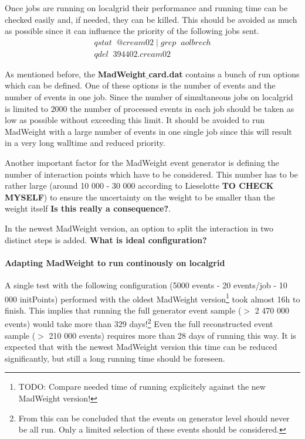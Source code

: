 Once jobs are running on localgrid their performance and running time can be checked easily and, if needed, they can be killed. This should be avoided as much as possible since it can influence the priority of the following jobs sent.
\begin{eqnarray}
 qstat \; \; @cream02 \; | \; grep \; \; aolbrech \\
 qdel \; \; 394402.cream02
\end{eqnarray}

As mentioned before, the \textbf{MadWeight$\_$card.dat} contains a bunch of run options which can be defined. One of these options is the number of events and the number of events in one job. Since the number of simultaneous jobs on localgrid is limited to $2000$ the number  of processed events in each job should be taken as low as possible without exceeding this limit. It should be avoided to run MadWeight with a large number of events in one single job since this will result in a very long walltime and reduced priority.

Another important factor for the MadWeight event generator is defining the number of interaction points which have to be considered. This number has to be rather large (around 10 000 - 30 000 according to Lieselotte \textbf{TO CHECK MYSELF}) to ensure the uncertainty on the weight to be smaller than the weight itself \textbf{Is this really a consequence?}.

In the newest MadWeight version, an option to split the interaction in two distinct steps is added. \textbf{What is ideal configuration?}

\paragraph{Adapting MadWeight to run continously on localgrid}
A single test with the following configuration (5000 events - 20 events/job - 10 000 initPoints) performed with the oldest MadWeight version\footnote{TODO: Compare needed time of running explicitely against the new MadWeight version!} took almost 16h to finish. This implies that running the full generator event sample ($>$ 2 470 000 events) would take more than 329 days!\footnote{From this can be concluded that the events on generator level should never be all run. Only a limited selection of these events should be considered.}
Even the full reconstructed event sample ($>$ 210 000 events) requires more than 28 days of running this way. It is expected that with the newest MadWeight version this time can be reduced significantly, but still a long running time should be foreseen.

